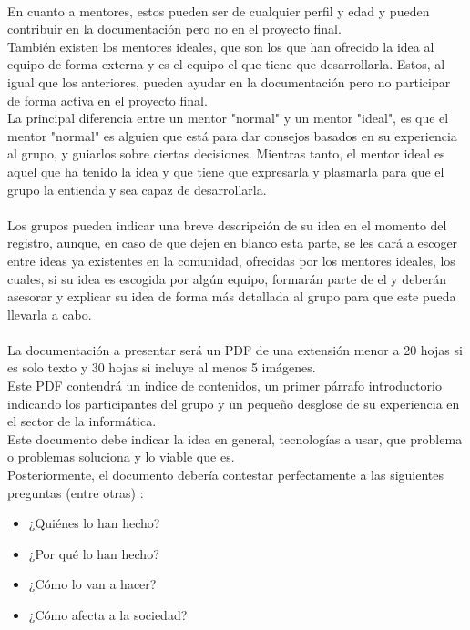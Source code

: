 \documentclass[a4paper]{article}
\begin{document}
    \paragraph{}
    En cuanto a mentores, estos pueden ser de cualquier perfil y edad y 
    pueden contribuir en la documentación pero no en el proyecto final.\\
    También existen los mentores ideales, que son los que han ofrecido 
    la idea al equipo de forma externa y es el equipo el que tiene 
    que desarrollarla. Estos, al igual que los anteriores, pueden ayudar 
    en la documentación pero no participar de forma activa en el proyecto 
    final.\\
    La principal diferencia entre un mentor "normal" y un mentor "ideal", 
    es que el mentor "normal" es alguien que está para dar consejos 
    basados en su experiencia al grupo, y guiarlos sobre ciertas decisiones.
    Mientras tanto, el mentor ideal es aquel que ha tenido la idea y que tiene 
    que expresarla y plasmarla para que el grupo la entienda y sea capaz 
    de desarrollarla.
    \paragraph{}
    Los grupos pueden indicar una breve descripción de su idea en el 
    momento del registro, aunque, en caso de que dejen en blanco esta 
    parte, se les dará a escoger entre ideas ya existentes en la 
    comunidad, ofrecidas por los mentores ideales, los cuales, si su 
    idea es escogida por algún equipo, formarán parte de el y deberán asesorar y 
    explicar su idea de forma más detallada al grupo para que este pueda llevarla a cabo.
    \paragraph{}
    La documentación a presentar será un PDF de una extensión menor a 20 hojas 
    si es solo texto y 30 hojas si incluye al menos 5 imágenes.\\
    Este PDF contendrá un indice de contenidos, un primer párrafo 
    introductorio indicando los participantes del grupo y un pequeño desglose de su 
    experiencia en el sector de la informática.\\
    Este documento debe indicar la idea en general, tecnologías a usar, que problema o 
    problemas soluciona y lo viable que es.\\
    Posteriormente, el documento debería contestar perfectamente a las siguientes preguntas
    (entre otras) :
    \begin{itemize}
        \item ¿Quiénes lo han hecho?
        \item ¿Por qué lo han hecho?
        \item ¿Cómo lo van a hacer?
        \item ¿Cómo afecta a la sociedad?
    \end{itemize}
\end{document}
